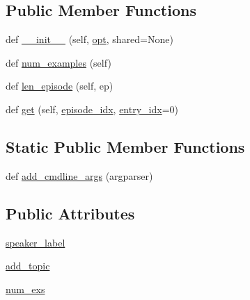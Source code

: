 \subsection*{Public Member Functions}
\begin{DoxyCompactItemize}
\item 
def \hyperlink{classparlai_1_1tasks_1_1wizard__of__wikipedia_1_1agents_1_1BasicdialogTeacher_a15a3b192484500d616eeac7bcd871cc2}{\+\_\+\+\_\+init\+\_\+\+\_\+} (self, \hyperlink{classparlai_1_1tasks_1_1wizard__of__wikipedia_1_1agents_1_1WizardOfWikipediaTeacher_a5d97ef38a8c6e7df29724122f5b9ff72}{opt}, shared=None)
\item 
def \hyperlink{classparlai_1_1tasks_1_1wizard__of__wikipedia_1_1agents_1_1BasicdialogTeacher_ac740a641709550f191b2c48adfb14a13}{num\+\_\+examples} (self)
\item 
def \hyperlink{classparlai_1_1tasks_1_1wizard__of__wikipedia_1_1agents_1_1BasicdialogTeacher_a2557378cd9519f4596b2fcc713698056}{len\+\_\+episode} (self, ep)
\item 
def \hyperlink{classparlai_1_1tasks_1_1wizard__of__wikipedia_1_1agents_1_1BasicdialogTeacher_ae457e3f6ba55bc18191d0fbcc4b408a1}{get} (self, \hyperlink{classparlai_1_1core_1_1teachers_1_1FixedDialogTeacher_afd4ebab8063eb42d182d30a1a41f133e}{episode\+\_\+idx}, \hyperlink{classparlai_1_1core_1_1teachers_1_1FixedDialogTeacher_ae3201b15f3c3b46a2f3511bad9b43e7d}{entry\+\_\+idx}=0)
\end{DoxyCompactItemize}
\subsection*{Static Public Member Functions}
\begin{DoxyCompactItemize}
\item 
def \hyperlink{classparlai_1_1tasks_1_1wizard__of__wikipedia_1_1agents_1_1BasicdialogTeacher_a05990443efe8ab6f6361cbea39d50dca}{add\+\_\+cmdline\+\_\+args} (argparser)
\end{DoxyCompactItemize}
\subsection*{Public Attributes}
\begin{DoxyCompactItemize}
\item 
\hyperlink{classparlai_1_1tasks_1_1wizard__of__wikipedia_1_1agents_1_1BasicdialogTeacher_aacc71f8c41cd2a67481e19e2d7bcdd6e}{speaker\+\_\+label}
\item 
\hyperlink{classparlai_1_1tasks_1_1wizard__of__wikipedia_1_1agents_1_1BasicdialogTeacher_a9eaad000a7aac1f96b497916d0cd6126}{add\+\_\+topic}
\item 
\hyperlink{classparlai_1_1tasks_1_1wizard__of__wikipedia_1_1agents_1_1BasicdialogTeacher_ab4f662982ef3d074d3d813f53d300ca4}{num\+\_\+exs}
\end{DoxyCompactItemize}

